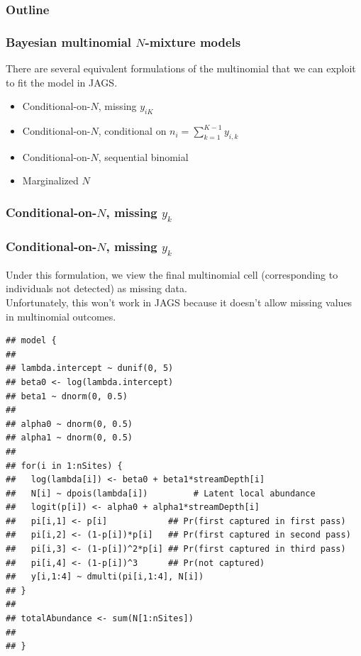 \documentclass[color=usenames,dvipsnames]{beamer}\usepackage[]{graphicx}\usepackage[]{color}
\makeatletter
\newenvironment{kframe}{%
 \def\at@end@of@kframe{}%
 \ifinner\ifhmode%
  \def\at@end@of@kframe{\end{minipage}}%
  \begin{minipage}{\columnwidth}%
 \fi\fi%
 \def\FrameCommand##1{\hskip\@totalleftmargin \hskip-\fboxsep
 \colorbox{shadecolor}{##1}\hskip-\fboxsep
     \hskip-\linewidth \hskip-\@totalleftmargin \hskip\columnwidth}%
 \MakeFramed {\advance\hsize-\width
   \@totalleftmargin\z@ \linewidth\hsize
   \@setminipage}}%
 {\par\unskip\endMakeFramed%
 \at@end@of@kframe}
\newenvironment{knitrout}{}{} %
\makeatother
\begin{document}
\begin{frame}
  \frametitle{Outline}
  \Large
\end{frame}


\begin{frame}
  \frametitle{Bayesian multinomial $N$-mixture models}
  There are several equivalent formulations of the multinomial that we
  can exploit to fit the model in JAGS.
  \begin{itemize}
    \item Conditional-on-$N$, missing $y_{iK}$
    \item Conditional-on-$N$, conditional on $n_i=\sum_{k=1}^{K-1} y_{i,k}$
    \item Conditional-on-$N$, sequential binomial
    \item Marginalized $N$
  \end{itemize}
  
\end{frame}




\begin{frame}[fragile]
  \frametitle{Conditional-on-$N$, missing $y_k$}
\end{frame}





\begin{frame}[fragile]
  \frametitle{Conditional-on-$N$, missing $y_k$}
  \footnotesize
  Under this formulation, we view the final multinomial cell
  (corresponding to individuals not detected) as missing data. \\
  \pause
  Unfortunately, this won't work in JAGS because it doesn't allow
  missing values in multinomial outcomes.
  \pause
\begin{knitrout}\tiny
{}\color{fgcolor}\begin{kframe}
\begin{verbatim}
## model {
## 
## lambda.intercept ~ dunif(0, 5)
## beta0 <- log(lambda.intercept)
## beta1 ~ dnorm(0, 0.5)
## 
## alpha0 ~ dnorm(0, 0.5)  
## alpha1 ~ dnorm(0, 0.5)
## 
## for(i in 1:nSites) {
##   log(lambda[i]) <- beta0 + beta1*streamDepth[i]
##   N[i] ~ dpois(lambda[i])         # Latent local abundance
##   logit(p[i]) <- alpha0 + alpha1*streamDepth[i]
##   pi[i,1] <- p[i]            ## Pr(first captured in first pass)
##   pi[i,2] <- (1-p[i])*p[i]   ## Pr(first captured in second pass)
##   pi[i,3] <- (1-p[i])^2*p[i] ## Pr(first captured in third pass)
##   pi[i,4] <- (1-p[i])^3      ## Pr(not captured)
##   y[i,1:4] ~ dmulti(pi[i,1:4], N[i])
## }
## 
## totalAbundance <- sum(N[1:nSites])
## 
## }
\end{verbatim}
\end{kframe}
\end{knitrout}

\end{frame}
\end{document}
